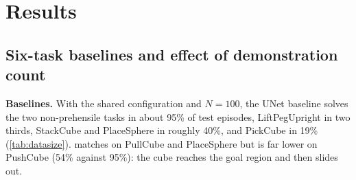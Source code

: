\section{Results}
\label{sec:results}
\subsection{Six-task baselines and effect of demonstration count}
\label{sec:datasize}


\textbf{Baselines.} With the shared configuration and $N=100$, the UNet
baseline solves the two non-prehensile tasks in about 95\% of test episodes,
LiftPegUpright in two thirds, StackCube and PlaceSphere in roughly 40\%, and
PickCube in 19\% (\cref{tab:datasize}). \metricend{} matches \metriconce{} on
PullCube and PlaceSphere but is far lower on PushCube (54\% against 95\%): the
cube reaches the goal region and then slides out.

